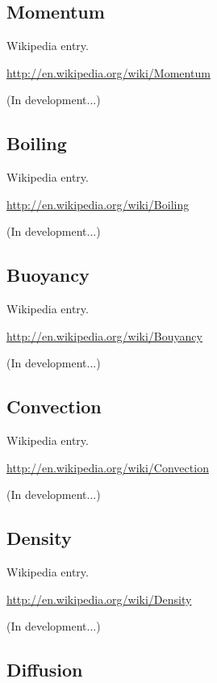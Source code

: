 \documentclass[12pt,twoside]{book}
\begin{document}
\subsection[Momentum]{Momentum}

Wikipedia entry.

\href{http://en.wikipedia.org/wiki/Momentum}{http://en.wikipedia.org/wiki/Momentum}

(In development...)

\subsection[Boiling]{Boiling}

Wikipedia entry.

\href{http://en.wikipedia.org/wiki/Boiling}{http://en.wikipedia.org/wiki/Boiling}

(In development...)

\subsection[Buoyancy]{Buoyancy}

Wikipedia entry.

\href{http://en.wikipedia.org/wiki/Bouyancy}{http://en.wikipedia.org/wiki/Bouyancy}

(In development...)

\subsection[Convection]{Convection}

Wikipedia entry.

\href{http://en.wikipedia.org/wiki/Convection}{http://en.wikipedia.org/wiki/Convection}

(In development...)

\subsection[Density]{Density}

Wikipedia entry.

\href{http://en.wikipedia.org/wiki/Density}{http://en.wikipedia.org/wiki/Density}

(In development...)

\subsection[Diffusion]{Diffusion}
\end{document}
